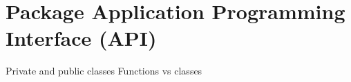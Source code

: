 \section{Package Application Programming Interface (API)}
Private and public classes
Functions vs classes

